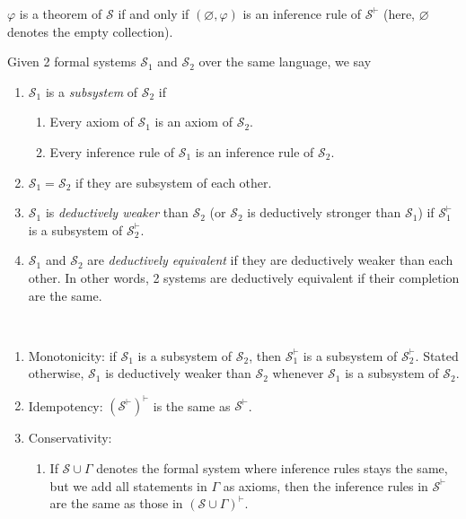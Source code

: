 \documentclass{treatise}
\begin{document}
\begin{shaded}
\begin{enumerate}
\end{enumerate}
\begin{remark} \label{logic-thm-infr-dual}
$\varphi$ is a theorem of $\mathcal{S}$ if and only if $(\varnothing, \varphi)$ is an inference rule of $\mathcal{S}^\vdash$ (here, $\varnothing$ denotes the empty collection).
\end{remark}
Given 2 formal systems $\mathcal{S}_1$ and $\mathcal{S}_2$ over the same language, we say
\begin{enumerate}
    \item $\mathcal{S}_1$ is a \emph{subsystem} of $\mathcal{S}_2$ if
    \begin{enumerate}
        \item Every axiom of $\mathcal{S}_1$ is an axiom of $\mathcal{S}_2$.
        \item Every inference rule of $\mathcal{S}_1$ is an inference rule of $\mathcal{S}_2$.
    \end{enumerate}
    \item $\mathcal{S}_1 = \mathcal{S}_2$ if they are subsystem of each other.
    \item $\mathcal{S}_1$ is \emph{deductively weaker} than $\mathcal{S}_2$ (or $\mathcal{S}_2$ is deductively stronger than $\mathcal{S}_1$) if $\mathcal{S}_1^\vdash$ is a subsystem of $\mathcal{S}_2^\vdash$.
    \item $\mathcal{S}_1$ and $\mathcal{S}_2$ are \emph{deductively equivalent} if they are deductively weaker than each other. In other words, 2 systems are deductively equivalent if their completion are the same. 
\end{enumerate}
\begin{proposition} \ 
\begin{enumerate}
    \item Monotonicity: if $\mathcal{S}_1$ is a subsystem of $\mathcal{S}_2$, then $\mathcal{S}_1^\vdash$ is a subsystem of $\mathcal{S}_2^\vdash$. Stated otherwise, $\mathcal{S}_1$ is deductively weaker than $\mathcal{S}_2$ whenever $\mathcal{S}_1$ is a subsystem of $\mathcal{S}_2$.
    \item Idempotency: $(\mathcal{S}^{\vdash})^{\vdash}$ is the same as $\mathcal{S}^{\vdash}$.
    \item Conservativity:
    \begin{enumerate}
        \item If $\mathcal{S} \cup \Gamma$ denotes the formal system where inference rules stays the same, but we add all statements in $\Gamma$ as axioms, then the inference rules in $\mathcal{S}^\vdash$ are the same as those in $(\mathcal{S} \cup \Gamma)^\vdash$.

\end{enumerate}
\end{enumerate}
\end{proposition}
\end{shaded}
\end{document}
